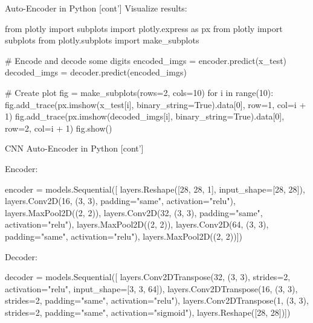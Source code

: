\documentclass[ignorenonframetext,xcolor=x11names]{beamer}
\begin{document}
\begin{frame}[label=withcode,fragile]{Auto-Encoder in Python \small [cont']}
Visualize results:

\begin{pythoncode}
from plotly import subplots
import plotly.express as px
from plotly import subplots
from plotly.subplots import make_subplots

# Encode and decode some digits
encoded_imgs = encoder.predict(x_test)
decoded_imgs = decoder.predict(encoded_imgs)

# Create plot
fig = make_subplots(rows=2, cols=10)
for i in range(10):
    fig.add_trace(px.imshow(x_test[i], 
        binary_string=True).data[0], 
        row=1, col=i + 1)
    fig.add_trace(px.imshow(decoded_imgs[i], 
        binary_string=True).data[0], 
        row=2, col=i + 1)
fig.show()
\end{pythoncode}
\end{frame}

\begin{frame}[label=withcode,fragile]{CNN Auto-Encoder in Python \small [cont']}

Encoder:
\begin{pythoncode}
encoder = models.Sequential([
    layers.Reshape([28, 28, 1], input_shape=[28, 28]),
    layers.Conv2D(16, (3, 3), 
                  padding="same", activation="relu"),
    layers.MaxPool2D((2, 2)),
    layers.Conv2D(32, (3, 3), 
                  padding="same", activation="relu"),
    layers.MaxPool2D((2, 2)),
    layers.Conv2D(64, (3, 3), 
                  padding="same", activation="relu"),
    layers.MaxPool2D((2, 2))])
\end{pythoncode}

Decoder:
\begin{pythoncode}
decoder = models.Sequential([
    layers.Conv2DTranspose(32, (3, 3), strides=2, 
               activation="relu", input_shape=[3, 3, 64]),
    layers.Conv2DTranspose(16, (3, 3), strides=2, 
               padding="same", activation="relu"),
    layers.Conv2DTranspose(1, (3, 3), strides=2, 
               padding="same", activation="sigmoid"),
    layers.Reshape([28, 28])])
\end{pythoncode}
\end{frame}
\end{document}
